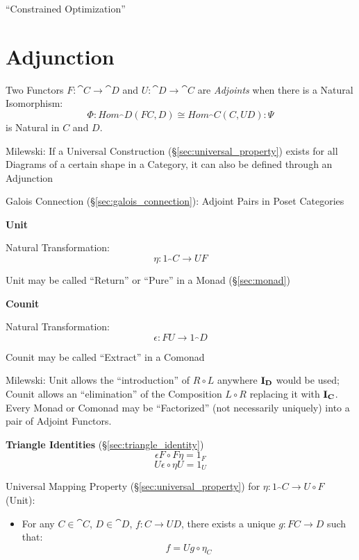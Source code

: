 ``Constrained Optimization'' %



\section{Adjunction}\label{sec:adjunction}


Two Functors $F : \cat{C} \rightarrow \cat{D}$ and $U : \cat{D}
\rightarrow \cat{C}$ are \emph{Adjoints} when there is a Natural
Isomorphism:
\[
  \Phi : Hom_\cat{D}(F C,D) \cong Hom_\cat{C}(C,U D) : \Psi
\]
is Natural in $C$ and $D$.


Milewski: If a Universal Construction (\S\ref{sec:universal_property})
exists for all Diagrams of a certain shape in a Category, it can also
be defined through an Adjunction

\fist Galois Connection (\S\ref{sec:galois_connection}): Adjoint
Pairs in Poset Categories


\textbf{Unit}

Natural Transformation:
\[
  \eta : 1_\cat{C} \rightarrow U F
\]

\fist Unit may be called ``Return'' or ``Pure'' in a Monad
(\S\ref{sec:monad})


\textbf{Counit}

Natural Transformation:
\[
  \epsilon : F U \rightarrow 1_\cat{D}
\]

\fist Counit may be called ``Extract'' in a Comonad


Milewski: Unit allows the ``introduction'' of $R \circ L$ anywhere
$\mathbf{I}_\mathbf{D}$ would be used; Counit allows an ``elimination'' of the
Composition $L \circ R$ replacing it with $\mathbf{I}_\mathbf{C}$. Every Monad
or Comonad may be ``Factorized'' (not necessarily uniquely) into a
pair of Adjoint Functors.


\textbf{Triangle Identities} (\S\ref{sec:triangle_identity})
\[
  \epsilon F \circ F \eta = 1_F
\]\[
  U \epsilon \circ \eta U = 1_U
\]


Universal Mapping Property (\S\ref{sec:universal_property}) for $\eta
: 1_\cat{C} \rightarrow U \circ F$ (Unit):
\begin{itemize}
\item For any $C \in \cat{C}$, $D \in \cat{D}$, $f : C
  \rightarrow U D$, there exists a unique $g : FC \rightarrow D$ such
  that:
  \[
    f = U g \circ \eta_C
  \]
\end{itemize}

